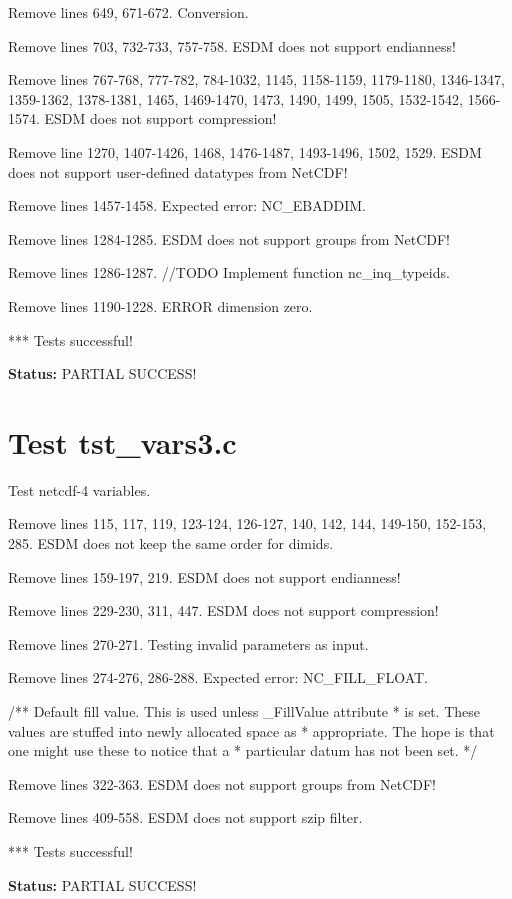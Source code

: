 Remove lines 649, 671-672. Conversion.

Remove lines 703, 732-733, 757-758. ESDM does not support endianness!

Remove lines 767-768, 777-782, 784-1032, 1145, 1158-1159, 1179-1180, 1346-1347, 1359-1362, 1378-1381, 1465, 1469-1470, 1473, 1490, 1499, 1505, 1532-1542, 1566-1574. ESDM does not support compression!

Remove line 1270, 1407-1426, 1468, 1476-1487, 1493-1496, 1502, 1529. ESDM does not support user-defined datatypes from NetCDF!

Remove lines 1457-1458. Expected error: NC\_EBADDIM.

Remove lines 1284-1285. ESDM does not support groups from NetCDF!

Remove lines 1286-1287. //TODO Implement function nc\_inq\_typeids.

Remove lines 1190-1228. ERROR dimension zero.

*** Tests successful!

{\bf \large Status: } PARTIAL SUCCESS!

\section{Test tst\_vars3.c}

Test netcdf-4 variables.

Remove lines 115, 117, 119, 123-124, 126-127, 140, 142, 144, 149-150, 152-153, 285. ESDM does not keep the same order for dimids.

Remove lines 159-197, 219. ESDM does not support endianness!

Remove lines 229-230, 311, 447. ESDM does not support compression!

Remove lines 270-271. Testing invalid parameters as input.

Remove lines 274-276, 286-288. Expected error: NC\_FILL\_FLOAT.

/** Default fill value. This is used unless \_FillValue attribute
 * is set.  These values are stuffed into newly allocated space as
 * appropriate.  The hope is that one might use these to notice that a
 * particular datum has not been set. */

Remove lines 322-363. ESDM does not support groups from NetCDF!

Remove lines 409-558. ESDM does not support szip filter.

*** Tests successful!

{\bf \large Status: } PARTIAL SUCCESS!


